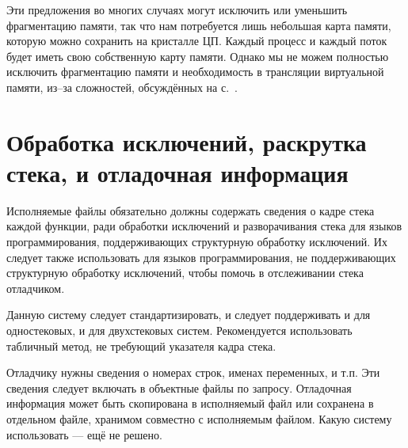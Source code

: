\documentclass[forwardcom.tex]{subfiles}
\begin{document}
Эти предложения во многих случаях могут исключить или уменьшить фрагментацию памяти, так что нам потребуется лишь небольшая карта памяти, которую можно сохранить на кристалле ЦП. Каждый процесс и каждый поток будет иметь свою собственную карту памяти. Однако мы не можем полностью исключить фрагментацию памяти и необходимость в трансляции виртуальной памяти, из--за сложностей, обсуждённых на с.~\pageref{memoryManagement}.

\section{Обработка исключений, раскрутка стека, и отладочная информация} \label{exceptionHandling}
Исполняемые файлы обязательно должны содержать сведения о кадре стека каждой функции, ради обработки исключений и разворачивания стека для языков программирования, поддерживающих структурную обработку исключений. Их следует также использовать для языков программирования, не поддерживающих структурную обработку исключений, чтобы помочь в отслеживании стека отладчиком.

Данную систему следует стандартизировать, и следует поддерживать и для одностековых, и для двухстековых систем.  Рекомендуется использовать табличный метод, не требующий указателя кадра стека.

Отладчику нужны сведения о номерах строк, именах переменных, и т.п. Эти сведения следует включать в объектные файлы по запросу. Отладочная информация может быть скопирована в исполняемый файл или сохранена в отдельном файле, хранимом совместно с исполняемым файлом. Какую систему использовать --- ещё не решено. 
\end{document}
